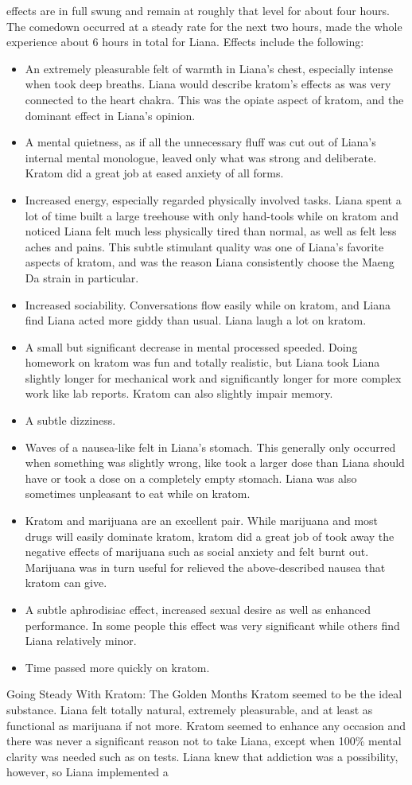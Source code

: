 \documentclass[12pt]{book}
\begin{document}
effects are in full swung and remain at roughly that level for about four hours. The comedown occurred at a steady rate for the next two hours, made the whole experience about 6 hours in total for Liana. Effects include the following:\begin{itemize} \item An extremely pleasurable felt of warmth in Liana's chest, especially intense when took deep breaths. Liana would describe kratom's effects as was very connected to the heart chakra. This was the opiate aspect of kratom, and the dominant effect in Liana's opinion.\item A mental quietness, as if all the unnecessary fluff was cut out of Liana's internal mental monologue, leaved only what was strong and deliberate. Kratom did a great job at eased anxiety of all forms.\item Increased energy, especially regarded physically involved tasks. Liana spent a lot of time built a large treehouse with only hand-tools while on kratom and noticed Liana felt much less physically tired than normal, as well as felt less aches and pains. This subtle stimulant quality was one of Liana's favorite aspects of kratom, and was the reason Liana consistently choose the Maeng Da strain in particular.\item Increased sociability. Conversations flow easily while on kratom, and Liana find Liana acted more giddy than usual. Liana laugh a lot on kratom.\item A small but significant decrease in mental processed speeded. Doing homework on kratom was fun and totally realistic, but Liana took Liana slightly longer for mechanical work and significantly longer for more complex work like lab reports. Kratom can also slightly impair memory.\item A subtle dizziness.\item Waves of a nausea-like felt in Liana's stomach. This generally only occurred when something was slightly wrong, like took a larger dose than Liana should have or took a dose on a completely empty stomach. Liana was also sometimes unpleasant to eat while on kratom.\item Kratom and marijuana are an excellent pair. While marijuana and most drugs will easily dominate kratom, kratom did a great job of took away the negative effects of marijuana such as social anxiety and felt burnt out. Marijuana was in turn useful for relieved the above-described nausea that kratom can give.\item A subtle aphrodisiac effect, increased sexual desire as well as enhanced performance. In some people this effect was very significant while others find Liana relatively minor.\item Time passed more quickly on kratom.\end{itemize} Going Steady With Kratom: The Golden Months Kratom seemed to be the ideal substance. Liana felt totally natural, extremely pleasurable, and at least as functional as marijuana if not more. Kratom seemed to enhance any occasion and there was never a significant reason not to take Liana, except when 100\% mental clarity was needed such as on tests. Liana knew that addiction was a possibility, however, so Liana implemented a 
\end{document}
